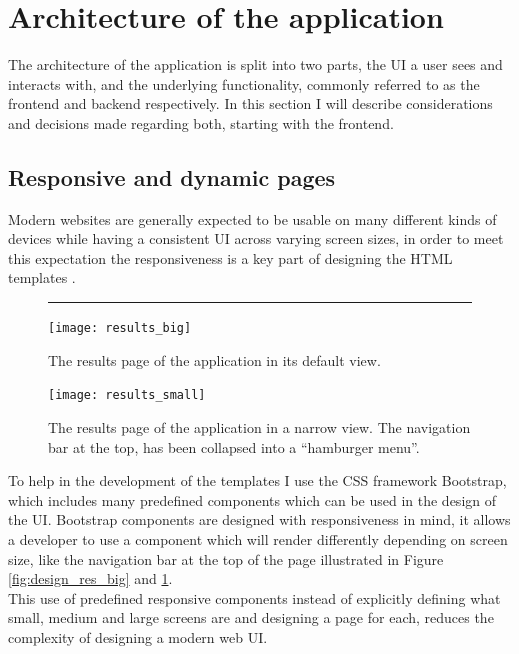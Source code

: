 \section{Architecture of the application}\label{design}
The architecture of the application is split into two parts, the UI a user sees and interacts with, and the underlying functionality, commonly referred to as the frontend and backend respectively. In this section I will describe considerations and decisions made regarding both, starting with the frontend.

\subsection{Responsive and dynamic pages}

Modern websites are generally expected to be usable on many different kinds of devices while having a consistent UI across varying screen sizes, in order to meet this expectation the responsiveness is a key part of designing the HTML templates \cite{responsive_article}.\\
\begin{figure}[b!]
\centering
\hrule
\vspace*{0.2cm}
\begin{minipage}{.5\textwidth}
\centering
\texttt{[image: results\_big]}
\caption{The results page of the application in its default view.}
\label{fig:design_res_big}
\end{minipage}%
\hspace{1cm}
\begin{minipage}{.4\textwidth}
\centering
\texttt{[image: results\_small]}
\caption{The results page of the application in a narrow view. The navigation bar at the top, has been collapsed into a ``hamburger menu''.}
\label{fig:design_res_small}
\end{minipage}
\end{figure}
To help in the development of the templates I use the  CSS framework Bootstrap, which includes many predefined components which can be used in the design of the UI. Bootstrap components are designed with responsiveness in mind, it allows a developer to use a component which will render differently depending on screen size, like the navigation bar at the top of the page illustrated in Figure \ref{fig:design_res_big} and \ref{fig:design_res_small}.\\This use of predefined responsive components instead of explicitly defining what small, medium and large screens are and designing a page for each, reduces the complexity of designing a modern web UI.
